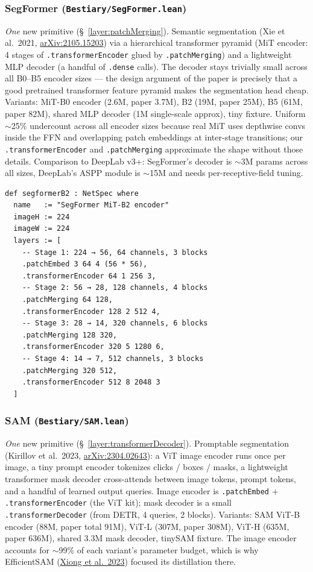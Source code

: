 \subsubsection*{SegFormer (\texttt{Bestiary/SegFormer.lean})}
\emph{One} new primitive (\S~\ref{layer:patchMerging}). Semantic segmentation (Xie et al.\ 2021,
\href{https://arxiv.org/abs/2105.15203}{arXiv:2105.15203}) via a
hierarchical transformer pyramid (MiT encoder: 4 stages of
\texttt{.transformerEncoder} glued by \texttt{.patchMerging}) and a
lightweight MLP decoder (a handful of \texttt{.dense} calls). The
decoder stays trivially small across all B0--B5 encoder sizes --- the
design argument of the paper is precisely that a good pretrained
transformer feature pyramid makes the segmentation head cheap.
Variants: MiT-B0 encoder (2.6M, paper 3.7M), B2 (19M, paper 25M),
B5 (61M, paper 82M), shared MLP decoder (1M single-scale approx),
tiny fixture. Uniform $\sim$25\% undercount across all encoder sizes
because real MiT uses depthwise convs inside the FFN and overlapping
patch embeddings at inter-stage transitions; our
\texttt{.transformerEncoder} and \texttt{.patchMerging} approximate
the shape without those details. Comparison to DeepLab v3+: SegFormer's
decoder is $\sim$3M params across all sizes, DeepLab's ASPP module
is $\sim$15M and needs per-receptive-field tuning.

\begin{verbatim}
def segformerB2 : NetSpec where
  name   := "SegFormer MiT-B2 encoder"
  imageH := 224
  imageW := 224
  layers := [
    -- Stage 1: 224 → 56, 64 channels, 3 blocks
    .patchEmbed 3 64 4 (56 * 56),
    .transformerEncoder 64 1 256 3,
    -- Stage 2: 56 → 28, 128 channels, 4 blocks
    .patchMerging 64 128,
    .transformerEncoder 128 2 512 4,
    -- Stage 3: 28 → 14, 320 channels, 6 blocks
    .patchMerging 128 320,
    .transformerEncoder 320 5 1280 6,
    -- Stage 4: 14 → 7, 512 channels, 3 blocks
    .patchMerging 320 512,
    .transformerEncoder 512 8 2048 3
  ]
\end{verbatim}

\subsubsection*{SAM (\texttt{Bestiary/SAM.lean})}
\emph{One} new primitive (\S~\ref{layer:transformerDecoder}). Promptable segmentation (Kirillov et
al.\ 2023, \href{https://arxiv.org/abs/2304.02643}{arXiv:2304.02643}): a ViT image encoder runs once per image, a tiny prompt
encoder tokenizes clicks / boxes / masks, a lightweight transformer
mask decoder cross-attends between image tokens, prompt tokens, and
a handful of learned output queries. Image encoder is
\texttt{.patchEmbed} + \texttt{.transformerEncoder} (the ViT kit);
mask decoder is a small \texttt{.transformerDecoder} (from DETR,
4 queries, 2 blocks). Variants: SAM ViT-B encoder (88M, paper total
91M), ViT-L (307M, paper 308M), ViT-H (635M, paper 636M), shared
3.3M mask decoder, tinySAM fixture. The image encoder accounts for
$\sim$99\% of each variant's parameter budget, which is why
EfficientSAM (\href{https://arxiv.org/abs/2312.00863}{Xiong et al.\ 2023})
focused its distillation there.

